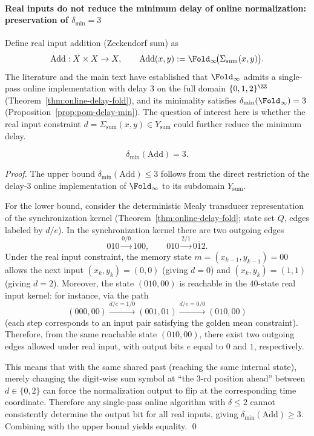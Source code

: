 \paragraph{Real inputs do not reduce the minimum delay of online normalization: preservation of \texorpdfstring{$\delta_{\min}=3$}{delta=3}}
Define real input addition (Zeckendorf sum) as
\[
\mathrm{Add}:X\times X\to X,\qquad
\mathrm{Add}(x,y):=\Fold_\infty\!\bigl(\Sigma_{\mathrm{sum}}(x,y)\bigr).
\]
The literature and the main text have established that $\Fold_\infty$ admits a single-pass online implementation with delay $3$ on the full domain $\{0,1,2\}^{\ZZ}$ (Theorem~\ref{thm:online-delay-fold}), and its minimality satisfies $\delta_{\min}(\Fold_\infty)=3$ (Proposition~\ref{prop:pom-delay-min}).
The question of interest here is whether the real input constraint $d=\Sigma_{\mathrm{sum}}(x,y)\in Y_{\mathrm{sum}}$ could further reduce the minimum delay.

\begin{proposition}\label{prop:real-input-add-delay-rigidity}
\[
\delta_{\min}(\mathrm{Add})=3.
\]
\end{proposition}

\begin{proof}
The upper bound $\delta_{\min}(\mathrm{Add})\le 3$ follows from the direct restriction of the delay-$3$ online implementation of $\Fold_\infty$ to its subdomain $Y_{\mathrm{sum}}$.

For the lower bound, consider the deterministic Mealy transducer representation of the synchronization kernel (Theorem~\ref{thm:online-delay-fold}; state set $Q$, edges labeled by $d/e$). In the synchronization kernel there are two outgoing edges
\[
010\xrightarrow{0/0}100,\qquad
010\xrightarrow{2/1}0\overline{1}2.
\]
Under the real input constraint, the memory state $m=(x_{k-1},y_{k-1})=00$ allows the next input $(x_k,y_k)=(0,0)$ (giving $d=0$) and $(x_k,y_k)=(1,1)$ (giving $d=2$).
Moreover, the state $(010,00)$ is reachable in the $40$-state real input kernel: for instance, via the path
\[
(000,00)\xrightarrow{d/e=1/0}(001,01)\xrightarrow{d/e=0/0}(010,00)
\]
(each step corresponds to an input pair satisfying the golden mean constraint).
Therefore, from the same reachable state $(010,00)$, there exist two outgoing edges allowed under real input, with output bits $e$ equal to $0$ and $1$, respectively.

This means that with the same shared past (reaching the same internal state), merely changing the digit-wise sum symbol at ``the $3$-rd position ahead'' between $d\in\{0,2\}$ can force the normalization output to flip at the corresponding time coordinate.
Therefore any single-pass online algorithm with $\delta\le 2$ cannot consistently determine the output bit for all real inputs, giving $\delta_{\min}(\mathrm{Add})\ge 3$.
Combining with the upper bound yields equality. \qed
\end{proof}
